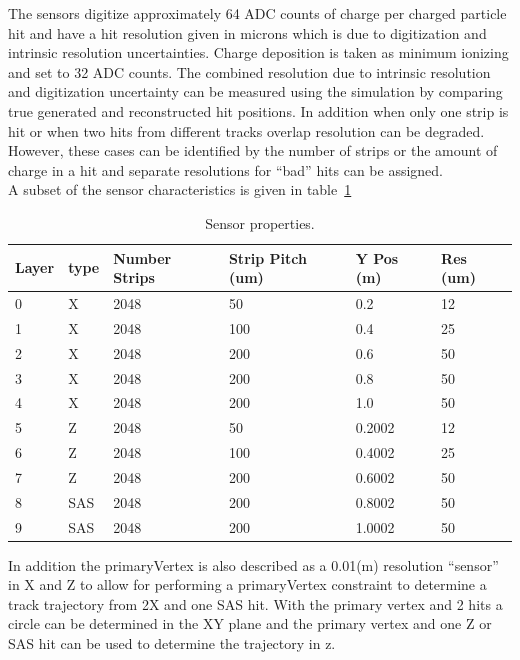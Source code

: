 \documentclass[aps,prd,superscriptaddress,floatfix]{revtex4}
\begin{document}
The sensors digitize approximately 64 ADC counts of charge per charged
particle hit and have a hit resolution given in microns which is due to
digitization and intrinsic resolution uncertainties.  Charge
deposition is taken as minimum ionizing and set to 32 ADC counts.  The combined resolution
due to intrinsic resolution and digitization uncertainty can be measured using the simulation by comparing true generated and reconstructed
hit positions.  In addition when only one strip is hit or when two hits from
different tracks overlap resolution can be degraded.  However, these cases can
be identified by the number of strips or the amount of charge in a hit and separate
resolutions for ``bad'' hits can be assigned.
\\

A subset of the sensor characteristics is given in table~\ref{tab:detectorTable}
\\

\begin{table}
\caption{\label{tab:detectorTable} Sensor properties.}
\begin{tabular}{|l|l|l|l|l|l|}
\hline 
Layer & type & Number Strips & Strip Pitch (um) & Y Pos (m) & Res (um)\\
\hline
0 & X & 2048 & 50	& 0.2 & 12	 \\
1 & X & 2048 & 100	& 0.4 & 25	 \\
2 & X & 2048 & 200	& 0.6 & 50	 \\
3 & X & 2048 & 200	& 0.8 & 50	 \\
4 & X & 2048 & 200	& 1.0 & 50	 \\
5 & Z & 2048 & 50	& 0.2002 & 12	 \\
6 & Z & 2048 & 100	& 0.4002 & 25	 \\
7 & Z & 2048 & 200	& 0.6002 & 50	 \\
8 & SAS & 2048 & 200	& 0.8002 & 50	 \\
9 & SAS & 2048 & 200	& 1.0002 & 50	 \\
\hline
\end{tabular}
\end{table}

In addition the primaryVertex is also described as a 0.01(m) resolution ``sensor'' in X and Z to allow
for performing a primaryVertex constraint to determine a track trajectory from 2X and one SAS
hit.  With the primary vertex and 2 hits a circle can be determined in the XY plane and the primary
vertex and one Z or SAS hit can be used to determine the trajectory in z.
\end{document}
